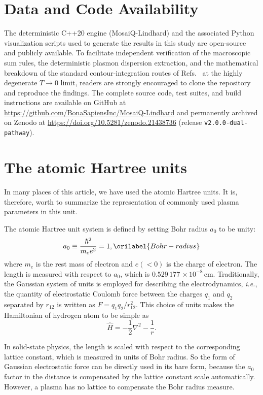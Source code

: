 \documentclass[aps,showkeys,noshowpacs,superscriptaddress,pre,preprint]{revtex4-2}
\let\label\orilabel
\begin{document}
\section*{Data and Code Availability}
The deterministic C++20 engine (MosaiQ-Lindhard) and the associated Python visualization scripts used to generate the results in this study are open-source and publicly available. To facilitate independent verification of the macroscopic sum rules, the deterministic plasmon dispersion extraction, and the mathematical breakdown of the standard contour-integration routes of Refs.~\cite{Giuliani-Vignale2005,Gouedard-Deutsch1978} at the highly degenerate $T \to 0$ limit, readers are strongly encouraged to clone the repository and reproduce the findings. The complete source code, test suites, and build instructions are available on GitHub at \url{https://github.com/BonaSapiensInc/MosaiQ-Lindhard} and permanently archived on Zenodo at \url{https://doi.org/10.5281/zenodo.21438736} (release \texttt{v2.0.0-dual-pathway}).

\appendix

\section{The atomic Hartree units}
\label{sec:atomic-units}

In many places of this article, we have used the atomic Hartree units. 
It is, therefore, worth to summarize the representation of commonly used plasma parameters in this unit.

The atomic Hartree unit system is defined by setting Bohr radius $a_0$ to be unity:
\begin{equation}
a_0 \equiv \frac{\hbar^2}{m_e e^2} = 1 ,
\label{Bohr-radius}
\end{equation}
where $m_e$ is the rest mass of electron and $e \left( < 0 \right)$ is the charge of electron.
The length is measured with respect to $a_0$,
which is $0.529\,177\, \times 10^{-8}$\,{cm}.
Traditionally, the Gaussian system of units is employed for describing the electrodynamics,
\textit{i.e.}, the quantity of electrostatic Coulomb force between the charges $q_1$ and $q_2$ separated by $r_{12}$
is written as $F = q_1 q_2 / r_{12}^2$.
This choice of units makes the Hamiltonian of hydrogen atom to be simple as
\begin{equation*}
\hat{H} = - \frac{1}{2} \nabla^2 - \frac{1}{r} .
\end{equation*}

In solid-state physics, the length is scaled with respect to the corresponding lattice constant, 
which is measured in units of Bohr radius.
So the form of Gaussian electrostatic force can be directly used in its bare form,
because the $a_0$ factor in the distance is compensated by the lattice constant scale automatically.
However, a plasma has no lattice to compensate the Bohr radius measure.
\end{document}
